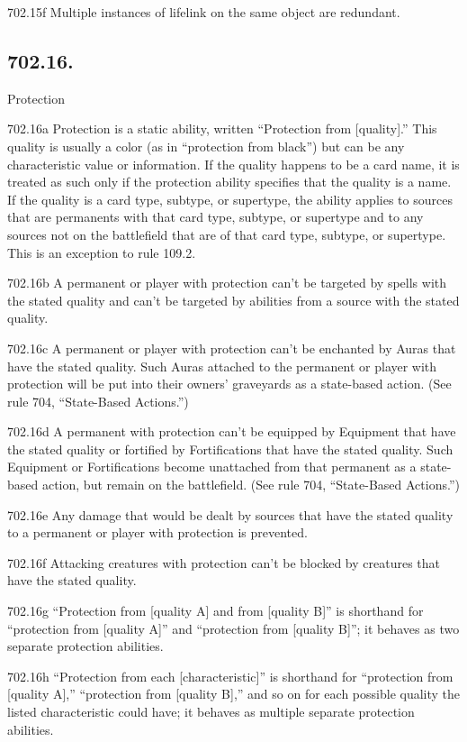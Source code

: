 702.15f Multiple instances of lifelink on the same object are redundant.

\subsection*{702.16.}
Protection

702.16a Protection is a static ability, written “Protection from [quality].” This quality is usually a color (as in “protection from black”) but can be any characteristic value or information. If the quality happens to be a card name, it is treated as such only if the protection ability specifies that the quality is a name. If the quality is a card type, subtype, or supertype, the ability applies to sources that are permanents with that card type, subtype, or supertype and to any sources not on the battlefield that are of that card type, subtype, or supertype. This is an exception to rule 109.2.

702.16b A permanent or player with protection can’t be targeted by spells with the stated quality and can’t be targeted by abilities from a source with the stated quality.

702.16c A permanent or player with protection can’t be enchanted by Auras that have the stated quality. Such Auras attached to the permanent or player with protection will be put into their owners’ graveyards as a state-based action. (See rule 704, “State-Based Actions.”)

702.16d A permanent with protection can’t be equipped by Equipment that have the stated quality or fortified by Fortifications that have the stated quality. Such Equipment or Fortifications become unattached from that permanent as a state-based action, but remain on the battlefield. (See rule 704, “State-Based Actions.”)

702.16e Any damage that would be dealt by sources that have the stated quality to a permanent or player with protection is prevented.

702.16f Attacking creatures with protection can’t be blocked by creatures that have the stated quality.

702.16g “Protection from [quality A] and from [quality B]” is shorthand for “protection from [quality A]” and “protection from [quality B]”; it behaves as two separate protection abilities.

702.16h “Protection from each [characteristic]” is shorthand for “protection from [quality A],” “protection from [quality B],” and so on for each possible quality the listed characteristic could have; it behaves as multiple separate protection abilities.

